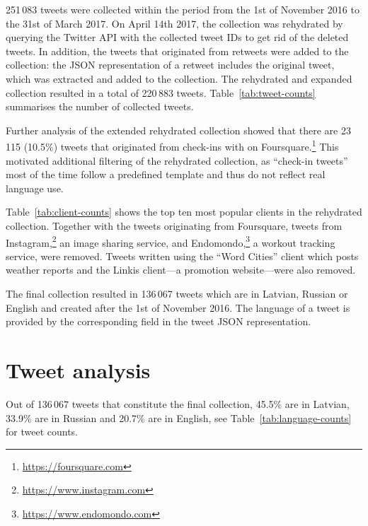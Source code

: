 \documentclass[11pt,a4paper]{article}
\begin{document}

251\,083 tweets were collected within the period from the 1st of November 2016 to the 31st of March 2017. On April 14th 2017, the collection was rehydrated by querying the Twitter API with the collected tweet IDs to get rid of the deleted tweets. In addition, the tweets that originated from retweets were added to the collection: the JSON representation of a retweet includes the original tweet, which was extracted and added to the collection. The rehydrated and expanded collection resulted in a total of 220\,883 tweets. Table~\ref{tab:tweet-counts} summarises the number of collected tweets.



Further analysis of the extended rehydrated collection showed that there are 23\,115 (10.5\%) tweets that originated from check-ins with on Foursquare.\footnote{\url{https://foursquare.com}} This motivated additional filtering of the rehydrated collection, as ``check-in tweets'' most of the time follow a predefined template and thus do not reflect real language use. %



Table~\ref{tab:client-counts} shows the top ten most popular clients in the rehydrated collection. Together with the tweets originating from Foursquare, tweets from Instagram,\footnote{\url{https://www.instagram.com}} an image sharing service, and Endomondo,\footnote{\url{https://www.endomondo.com}} a workout tracking service, were removed. Tweets written using the ``Word Cities'' client which posts weather reports and the Linkis client---a promotion website---were also removed.

The final collection resulted in 136\,067 tweets which are in Latvian, Russian or English and created after the 1st of November 2016. The language of a tweet is provided by the corresponding field in the tweet JSON representation.

\section{Tweet analysis}
\label{sec:timeline}



Out of 136\,067 tweets that constitute the final collection, 45.5\% are in Latvian, 33.9\% are in Russian and 20.7\% are in English, see Table~\ref{tab:language-counts} for tweet counts.
\end{document}
